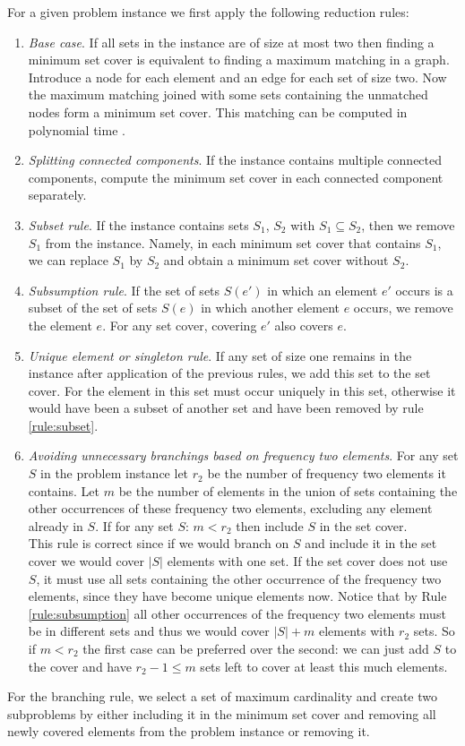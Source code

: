 \documentclass[fleqn]{stacs_proc}
\begin{document}
For a given problem instance we first apply the following reduction rules:
\begin{enumerate}
\item {\em Base case}. \label{rule:matching}
	  If all sets in the instance are of size at most two then finding
	  a minimum set cover is equivalent to finding a maximum matching in a graph.
	  Introduce a node for each element and an edge for each set of size two.
	  Now the maximum matching joined with some sets containing the unmatched nodes
	  form a minimum set cover. This matching can be computed in polynomial time \cite{Edmonds65}.
\item {\em Splitting connected components}. \label{rule:component}
		If the instance contains multiple connected components, compute the minimum set cover in each connected component separately.
\item {\em Subset rule}. \label{rule:subset}
	  If the instance contains sets $S_1$, $S_2$ with $S_1 \subseteq S_2$,
	  then we remove $S_1$ from the instance. Namely, in each minimum set
	  cover that contains $S_1$, we can replace $S_1$ by $S_2$ and obtain
	  a minimum set cover without $S_2$.
\item {\em Subsumption rule}. \label{rule:subsumption}
	  If the set of sets $S(e')$ in which an element $e'$ occurs is a subset of the set of sets $S(e)$
	  in which another element $e$ occurs, we remove the element $e$.
	  For any set cover, covering $e'$ also covers $e$.
\item {\em Unique element or singleton rule}.
	  If any set of size one remains in the instance after application of the previous rules, 
	  we add this set to the set cover. For the element in this set must occur uniquely in this set,
	  otherwise it would have been a subset of another set and have been removed by rule \ref{rule:subset}.
\item {\em Avoiding unnecessary branchings based on frequency two elements}. \label{rule:special}
	  For any set $S$ in the problem instance let $r_2$ be the number of frequency two elements it contains.
	  Let $m$ be the number of elements in the union of sets containing the other occurrences of these
	  frequency two elements, excluding any element already in $S$.
	  If for any set $S$: $m < r_2$ then include $S$ in the set cover. \\
	  This rule is correct since if we would branch on $S$ and include it in the set cover we would
	  cover $|S|$ elements with one set. If the set cover does not use $S$,
	  it must use 
	  all sets containing the other occurrence of the frequency two elements,
	  since they have become unique elements now. Notice that by Rule \ref{rule:subsumption}
	  all other occurrences of the frequency two elements must be in different sets and
	  thus we would cover $|S| + m$ elements with $r_2$ sets.
	  So if $m < r_2$ the first case can be preferred over the second: we can just add $S$ to the
	  cover and have $r_2 - 1 \leq m$ sets left to cover at least this much elements.
\end{enumerate}
For the branching rule, we select a set of maximum cardinality and
create two subproblems by either including it in the minimum set cover and removing all
newly covered elements from the problem instance or removing it.
\end{document}
